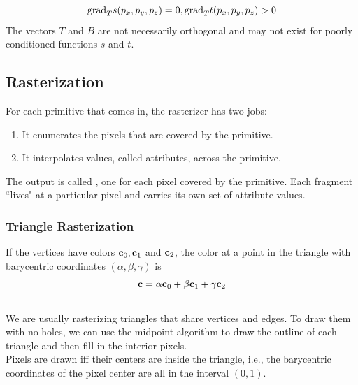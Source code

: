 \documentclass[11pt]{article}
\numberwithin{equation}{section}
\begin{document}
\begin{equation}
	\text{grad}_T s(p_x, p_y, p_z) = 0, \text{grad}_T t(p_x, p_y, p_z) > 0
\end{equation}
\remark
The vectors $T$ and $B$ are not necessarily orthogonal and may not exist for poorly conditioned functions $s$ and $t$.

\subsection{Rasterization}
For each primitive that comes in, the rasterizer has two jobs:
\begin{enumerate}
	\item It enumerates the pixels that are covered by the primitive.
	\item It interpolates values, called attributes, across the primitive.
\end{enumerate}
The output is called , one for each pixel covered by the primitive. Each fragment ``lives" at a particular pixel and carries its own set of attribute values.

\subsubsection{Triangle Rasterization}
If the vertices have colors $\textbf{c}_0, \textbf{c}_1$ and $\textbf{c}_2$, the color at a point in the triangle with barycentric coordinates $(\alpha, \beta, \gamma)$ is
\begin{equation}
	\textbf{c} = \alpha\textbf{c}_0 + \beta \textbf{c}_1 + \gamma\textbf{c}_2
\end{equation}
\\
We are usually rasterizing triangles that share vertices and edges. To draw them with no holes, we can use the midpoint algorithm to draw the outline of each triangle and then fill in the interior pixels.\\
Pixels are drawn iff their centers are inside the triangle, i.e., the barycentric coordinates of the pixel center are all in the interval $(0,1)$.
\end{document}
